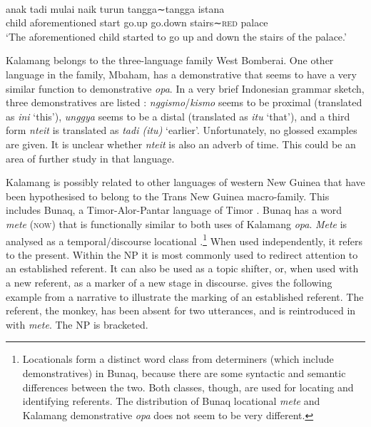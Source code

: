 \documentclass[output=paper,colorlinks,citecolor=brown]{langscibook}
\begin{document}
\ea \label{exe:tadi2}
\\
\gll anak tadi mulai naik turun tangga∼tangga istana\\
	child aforementioned start go.up go.down stairs∼\textsc{red} palace\\
	\glt `The aforementioned child started to go up and down the stairs of the palace.'
\z 		


Kalamang belongs to the three-language family West Bomberai. One other language in the family, Mbaham, has a demonstrative that seems to have a very similar function to demonstrative \textit{opa}. In a very brief Indonesian grammar sketch, three demonstratives are listed \citep{Flassy1984}: \textit{nggismo}/\textit{kismo} seems to be proximal (translated as \textit{ini} `this'), \textit{unggya} seems to be a distal (translated as \textit{itu} `that'), and a third form \textit{nteit} is translated as \textit{tadi (itu)} `earlier'. Unfortunately, no glossed examples are given. It is unclear whether \textit{nteit} is also an adverb of time. This could be an area of further study in that language.

Kalamang is possibly related to other languages of western New Guinea that have been hypothesised to belong to the Trans New Guinea macro-family. This includes Bunaq, a Timor-Alor-Pantar language of Timor \citep{UsherSchapperND}. Bunaq has a word \textit{mete} (\textsc{now}) that is functionally similar to both uses of Kalamang \textit{opa}. \textit{Mete} is analysed as a temporal/discourse locational \citep[285]{Schapper2009}.\footnote{Locationals form a distinct word class from determiners (which include demonstratives) in Bunaq, because there are some syntactic and semantic differences between the two. Both classes, though, are used for locating and identifying referents. The distribution of Bunaq locational \textit{mete} and Kalamang demonstrative \textit{opa} does not seem to be very different.} When used independently, it refers to the present. Within the NP it is most commonly used to redirect attention to an established referent. It can also be used as a topic shifter, or, when used with a new referent, as a marker of a new stage in discourse. \cite{Schapper2009} gives the following example from a narrative to illustrate the marking of an established referent. The referent, the monkey, has been absent for two utterances, and is reintroduced in  with \textit{mete}. The NP is bracketed.
\end{document}
